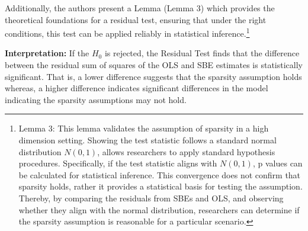 \begin{enumerate}
    Additionally, the authors present a Lemma (Lemma 3) which provides the theoretical foundations for a residual test, ensuring that under the right conditions, this test can be applied reliably in statistical inference.\footnote{Lemma 3: This lemma validates the assumption of sparsity in a high dimension setting. Showing the test statistic follows a standard normal distribution $N(0,1)$, allows researchers to apply standard hypothesis procedures. Specifically, if the test statistic aligns with $N(0,1)$, p values can be calculated for statistical inference. This convergence does not confirm that sparsity holds, rather it provides a statistical basis for testing the assumption. Thereby, by comparing the residuals from SBEs and OLS, and observing whether they align with the normal distribution, researchers can determine if the sparsity assumption is reasonable for a particular scenario.}
\end{enumerate}

\textbf{Interpretation:} If the $H_0$ is rejected, the Residual Test finds that the difference between the residual sum of squares of the OLS and SBE estimates is statistically significant. That is, a lower difference suggests that the sparsity assumption holds whereas, a higher difference indicates significant differences in the model indicating the sparsity assumptions may not hold. 